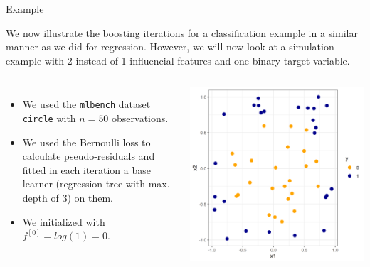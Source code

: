 \begin{vbframe}{Example}

We now illustrate the boosting iterations for a classification example in a similar manner as we did for regression.
However, we will now look at a simulation example with 2 instead of 1 influencial features and one binary target variable.

\begin{columns}
\column{5.5cm}
\begin{itemize}
\item We used the \texttt{mlbench} dataset \texttt{circle} with $n = 50$ observations.
\item We used the Bernoulli loss to calculate pseudo-residuals and fitted in each iteration a base learner (regression tree with max. depth of 3) on them.
\item We initialized with $f^{[0]} = log(1) = 0.$
\end{itemize}
\column{4.5cm}
\begin{center}
\includegraphics[width=\textwidth]{figure_man/boosting_classif_example.png}
\end{center}

\end{columns}



\end{vbframe}

